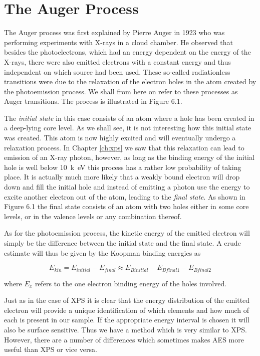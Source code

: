 \chapter{The Auger Process}
The Auger process was first explained by  Pierre Auger in 1923 who was performing experiments with X-rays in a cloud chamber. He observed that besides the photoelectrons, which had an energy dependent on the energy of the X-rays, there were also emitted electrons with a constant energy and thus independent on which source had been used. These so-called radiationless transitions were due  to the relaxation of the electron holes in the atom created by the photoemission process. We shall from here on refer to these processes as Auger transitions. The process is illustrated in Figure 6.1.

The {\em initial state} in this case consists of an atom where a hole has been created in a deep-lying core level. As we shall see, it is not interesting how this initial state was created. This atom is now highly excited and will eventually undergo a relaxation process. In Chapter \ref{ch:xps} we saw that this relaxation can lead to emission of an X-ray photon, however, as long as the binding energy of the initial hole is well below \SI{10}{k\electronvolt} this process has a rather low probability of taking place. It is actually much more likely that a  weakly bound electron will drop down and fill the initial hole and instead of emitting a photon use the energy to excite another electron out of the atom, leading to the {\em final state}. As  shown in Figure 6.1 the final state consists of an atom with two holes either in some core levels, or in the  valence  levels or any combination thereof.

As for the photoemission process, the  kinetic energy of the emitted electron will simply be the difference between the initial state and the final state. A crude estimate will thus be given by the Koopman binding energies as

\begin{equation}\label{eq:ekinkoopman}
E_{kin}=E_{initial}-E_{final}\approx E_{B          initial}-E_{Bfinal1}-E_{Bfinal2}
\end{equation}

where $E_x$ refers to the one electron binding energy of the holes involved.

Just as in the case of XPS it is clear that the energy distribution of the emitted electron will provide a unique identification of which elements and how much of each is present in our sample. If the appropriate energy interval is chosen it will also be surface sensitive. Thus we have a method which is very  similar  to XPS. However, there are a number of differences which sometimes makes AES more useful than XPS or vice versa.

